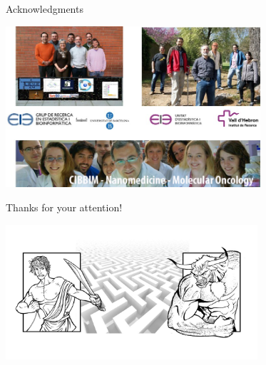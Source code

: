 \documentclass[handout]{beamer}
\begin{document}
\begin{frame}{Acknowledgments}
 \begin{center}
\includegraphics[height=6cm]{./images/agraiments.jpg}
\end{center}
  \end{frame}

\begin{frame}
 \begin{center}
 {\Huge
Thanks for your attention!}
\end{center}

\begin{center}
\includegraphics[height=5cm]{./images/teseo.jpg}
\end{center}


  \end{frame}
\end{document}
